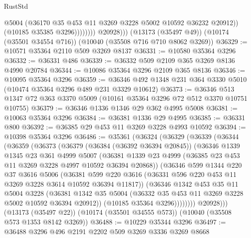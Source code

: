 \begin{lexlean}{RustStd}
\begin{coremodule}
                          @5004
                          (@36170 @35 @453 @11 @3269 @3228 @5002 @10592 @36232 @20912))
                        (@10185 @35385 @3296))))))))
          @20928)))
    (@13173 (@35497 @49))
    (@10174 (@35501 @34554 @716))
    (@10040 (@35508 @716 @710 @8062 @3269))
@36329 := @10571 @35364 @2110 @509 @3269 @8137
@36331 := @10580 @35364 @3296
@36332 := @36331 @486
@36339 := @36332 @509 @2109 @365 @3269 @8136 @4990 @20784
@36344 := @10086 @35364 @3296 @2109 @365 @8136
@36346 := @10095 @35364 @3296
@36359 := @36346 @492 @1348 @231 @364 @3330 @5010 (@10474 @35364 @3296 @489 @231 @3329 @10612)
@36373 := @36346 @513 @1347 @72 @363 @3370 @5009 (@10161 @35364 @3296 @72 @512 @3370 @10751 @10755)
@36379 := @36346 @1336 @1346 @29 @362 @4995 @5008
@36381 := @10063 @35364 @3296
@36384 := @36381 @1336 @29 @4995
@36385 := @36331 @800
@36392 := @36385 @29 @453 @11 @3269 @3228 @4993 @10592
@36394 := @10398 @35364 @3296
@36486 := @35361
    (@36324
      (@36329
        (@36339
          (@36344
            (@36359
              (@36373
                (@36379
                  (@36384 (@36392 @36394 @20845))
                  (@36346
                    @1339
                    @1345
                    @23
                    @361
                    @4999
                    @5007
                    (@36381
                      @1339
                      @23
                      @4999
                      (@36385 @23 @453 @11 @3269 @3228 @4997 @10592 @36394 @20868))
                    (@36346
                      @599
                      @1344
                      @220
                      @37
                      @3616
                      @5006
                      (@36381
                        @599
                        @220
                        @3616
                        (@36331 @596 @220 @453 @11 @3269 @3228 @3614 @10592 @36394 @11817))
                      (@36346
                        @1342
                        @453
                        @35
                        @11
                        @5004
                        @3228
                        (@36381
                          @1342
                          @35
                          @5004
                          (@36332 @35 @453 @11 @3269 @3228 @5002 @10592 @36394 @20912))
                        (@10185 @35364 @3296))))))))
          @20928)))
    (@13173 (@35497 @22))
    (@10174 (@35501 @34555 @573))
    (@10040 (@35508 @573 @1353 @8142 @3269))
@36488 := @10229 @35344 @3296
@36497 := @36488 @3296 @496 @2191 @2202 @509 @3269 @3336 @3269 @8668

\end{coremodule}
\end{lexlean}
